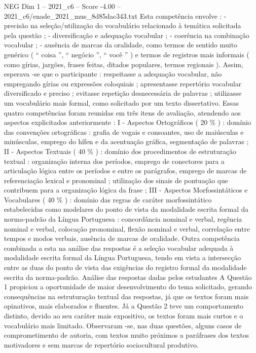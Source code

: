 \begin{textsample}{NEG Dim 1 – 2021\_c6 – Score -4.00 – 2021\_c6/enade\_2021\_mus\_8d85dac343.txt}
Esta competência envolve : - precisão na seleção/utilização do vocabulário relacionado à temática solicitada pela questão ; - diversificação e adequação vocabular ; - coerência na combinação vocabular ; - ausência de marcas da oralidade, como termos de sentido muito genérico ( “ coisa ”, “ negócio ”, “ você ” ) e termos de registros mais informais ( como gírias, jargões, frases feitas, ditados populares, termos regionais ).
Assim, esperava -se que o participante : respeitasse a adequação vocabular, não empregando gírias ou expressões coloquiais ; apresentasse repertório vocabular diversificado e preciso ; evitasse repetição desnecessária de palavras ; utilizasse um vocabulário mais formal, como solicitado por um texto dissertativo.
Essas quatro competências foram reunidas em três itens de avaliação, atendendo aos aspectos explicitados anteriormente : I - Aspectos Ortográficos ( 20 \% ) : domínio das convenções ortográficas : grafia de vogais e consoantes, uso de maiúsculas e minúsculas, emprego do hífen e da acentuação gráfica, segmentação de palavras ; II - Aspectos Textuais ( 40 \% ) : domínio dos procedimentos de estruturação textual : organização interna dos períodos, emprego de conectores para a articulação lógica entre os períodos e entre os parágrafos, emprego de marcas de referenciação lexical e pronominal ; utilização dos sinais de pontuação que contribuem para a organização lógica da frase ; III - Aspectos Morfossintáticos e Vocabulares ( 40 \% ) : domínio das regras de caráter morfossintático estabelecidas como modelares do ponto de vista da modalidade escrita formal da norma-padrão da Língua Portuguesa : concordância nominal e verbal, regência nominal e verbal, colocação pronominal, flexão nominal e verbal, correlação entre tempos e modos verbais, ausência de marcas de oralidade.
Outra competência combinada a esta na análise das respostas é a seleção vocabular adequada à modalidade escrita formal da Língua Portuguesa, tendo em vista a intersecção entre as duas do ponto de vista das exigências do registro formal da modalidade escrita da norma-padrão.
Análise das respostas dadas pelos estudantes A Questão 1 propiciou a oportunidade de maior desenvolvimento do tema solicitado, gerando consequências na estruturação textual das respostas, já que os textos foram mais opinativos, mais elaborados e fluentes.
Já a Questão 2 teve um comportamento distinto, devido ao seu caráter mais expositivo, os textos foram mais curtos e o vocabulário mais limitado.
Observaram -se, nas duas questões, alguns casos de comprometimento de autoria, com textos muito próximos a paráfrases dos textos motivadores e sem marcas de repertório sociocultural produtivo.

\end{textsample}
